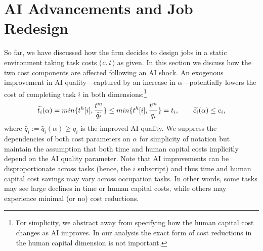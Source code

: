 \documentclass{article}
\theoremstyle{plain}
\theoremstyle{plain}
\begin{document}
\begin{comment}
Thus, if we fill in our table for all $W(i,\; j,\; \hccost{},\; \timecost{})$ where $i \leq n$ and $\hccost{}$ and $\timecost{}$ are discretized into powers of $(1+\epsilon)$, ranging from the smallest individual task's time and skill costs up to the sum of the time and skill costs over all $n$ tasks (representing the worst-case accumulated cost), we obtain a $(1 + O(\epsilon))$ approximation to the optimal solution.
This computation runs in time polynomial in $n$, $\frac{1}{\epsilon}$. %
In particular, the algorithm computes solutions for:
\begin{itemize}
\item $n$ task indices (from $1$ to $n$),
\item $O(\frac{n}{\epsilon})$ discretized time buckets,
\item $O(\frac{n}{\epsilon})$ discretized skill buckets.
\end{itemize}
Multiplying these yields a total time complexity of:
\[
O\left(n \times \frac{n}{\epsilon} \times \frac{n}{\epsilon}\right) = O\left(\frac{n^3}{\epsilon^2}\right).
\]
\end{comment}




\section{AI Advancements and Job Redesign}
\label{sec:job_redesign}

So far, we have discussed how the firm decides to design jobs in a static environment taking task costs ($c_{}, t_{}$) as given.
In this section we discuss how the two cost components are affected following an AI shock.
An exogenous improvement in AI quality---captured by an increase in $\alpha$---potentially lowers the cost of completing task $i$ in both dimensions:\footnote{For simplicity, we abstract away from specifying how the human capital cost changes as AI improves. In our analysis the exact form of cost reductions in the human capital dimension is not important.}
\[
\widetilde{t_{i}}(\alpha) = min\{t^{h}_{}{}[i], \frac{t^{m}_{}{}}{\widetilde{q_{i}}}\} \le min\{t^{h}_{}{}[i], \frac{t^{m}_{}{}}{q_{i}}\} = t_{i},
\qquad
\widetilde{c_{i}}(\alpha) \le c_{i},
\]
where $\widetilde{q_{i}} := \widetilde{q_{i}}(\alpha) \geq q_{i}$ is the improved AI quality. 
We suppress the dependencies of both cost parameters on $\alpha$ for simplicity of notation but maintain the assumption that both time and human capital costs implicitly depend on the AI quality parameter.
Note that AI improvements can be disproportionate across tasks (hence, the $i$ subscript) and thus time and human capital cost savings may vary across occupation tasks.
In other words, some tasks may see large declines in time or human capital costs, while others may experience minimal (or no) cost reductions.  
\end{document}

